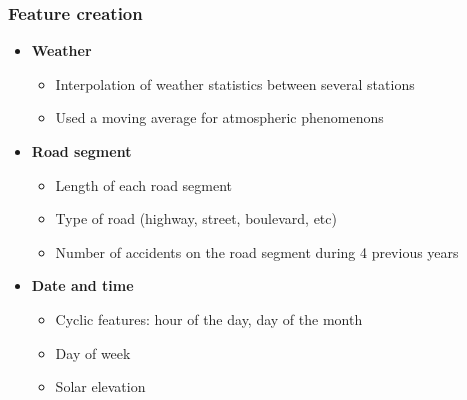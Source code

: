 \documentclass[slidestop,compress,red,mathserif]{beamer}
\begin{document}
\begin{frame}
	\frametitle{Feature creation}
	\begin{itemize}
    \item[] \textbf{Weather}
    \begin{itemize}
      \item Interpolation of weather statistics  between several stations
      \item Used a moving average for atmospheric phenomenons
    \end{itemize}
    \item[] \textbf{Road segment}
    \begin{itemize}
      \item Length of each road segment
      \item Type of road (highway, street, boulevard, etc)
      \item Number of accidents on the road segment during 4 previous years
    \end{itemize}
    \item[] \textbf{Date and time} \begin{itemize}
      \item Cyclic features: hour of the day, day of the month
      \item Day of week
      \item Solar elevation
    \end{itemize}
	\end{itemize}
\end{frame}
\end{document}
